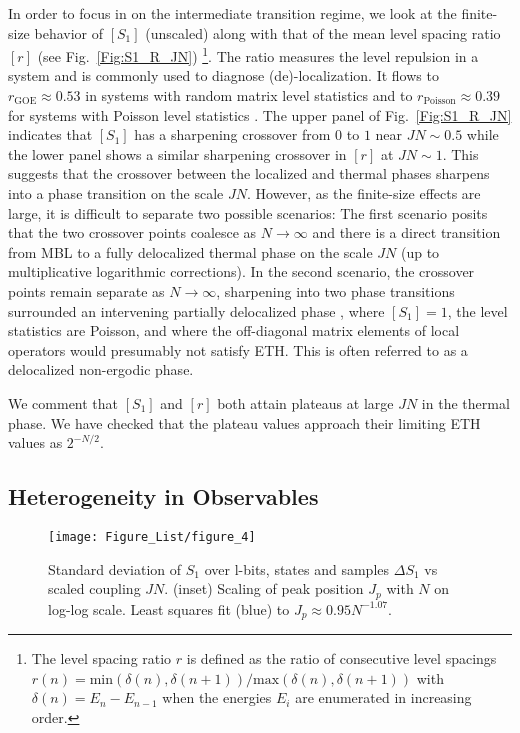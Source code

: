 \documentclass[aps,pra,twocolumn,a4paper,showpacs,superscriptaddress,floatfix,10pt]{revtex4}
\begin{document}
In order to focus in on the intermediate transition regime, we look at the finite-size behavior of
$[S_1]$ (unscaled) along with that of the mean level spacing ratio $[r]$ (see Fig.~\ref{Fig:S1_R_JN})
%
\footnote{The level spacing ratio $r$ is defined as the ratio of consecutive level spacings $r(n) = \textrm{min}(\delta(n),\delta(n+1))/\textrm{max}(\delta(n),\delta(n+1))$ with $\delta(n) = E_n - E_{n-1}$ when the energies $E_i$ are enumerated in increasing order.}.
%
The ratio measures the level repulsion in a system and is commonly used to diagnose (de)-localization.
It flows to $r_{\textrm{GOE}} \approx 0.53$ in systems with random matrix level statistics and to $r_{\textrm{Poisson}} \approx 0.39$ for systems with Poisson level statistics \cite{Oganesyan:2007aa,Atas:2013aa}.
%
The upper panel of Fig.~\ref{Fig:S1_R_JN} indicates that $[S_1]$ has a sharpening crossover from $0$ to $1$ near $JN \sim 0.5$ while the lower panel shows a similar sharpening crossover in $[r]$ at $JN \sim 1$.
%
This suggests that the crossover between the localized and thermal phases sharpens into a phase transition on the scale $JN$.
However, as the finite-size effects are large, it is difficult to separate two possible scenarios:
The first scenario posits that the two crossover points coalesce as $N \to \infty$ and there is a direct transition from MBL to a fully delocalized thermal phase on the scale $JN$ (up to multiplicative logarithmic corrections).
In the second scenario, the crossover points remain separate as $N \to \infty$, sharpening into two phase transitions surrounded an intervening partially delocalized phase \cite{Altshuler:1997aa}, where $[S_1]=1$, the level statistics are Poisson, and where the off-diagonal matrix elements of local operators would presumably not satisfy ETH.
This is often referred to as a delocalized non-ergodic phase.

We comment that $[S_1]$ and $[r]$ both attain plateaus at large $JN$ in the thermal phase. We have checked that the plateau values approach their limiting ETH values as $2^{-N/2}$.

\subsection{Heterogeneity in Observables} %
\label{sub:numerics_observables}

\begin{figure}[tb]
	\centering
	\texttt{[image: Figure\_List/figure\_4]}
	\caption{
	Standard deviation of $S_1$ over l-bits, states and samples $\Delta S_1$ vs scaled coupling $JN$.
	(inset) Scaling of peak position $J_p$ with $N$ on log-log scale. Least squares fit (blue) to $J_p \approx 0.95 N^{-1.07}$.
	}
	\label{fig:DeltaS_JN}
\end{figure}
\end{document}
